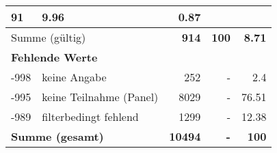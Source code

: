 \begin{longtable}{lXrrr}
       \num{91} &
       \num[round-mode=places,round-precision=2]{9.96} &
         \num[round-mode=places,round-precision=2]{0.87} \\
     \midrule
     \multicolumn{2}{l}{Summe (gültig)} &
       \textbf{\num{914}} &
     \textbf{\num{100}} &
       \textbf{\num[round-mode=places,round-precision=2]{8.71}} \\
     \multicolumn{5}{l}{\textbf{Fehlende Werte}}\\
       -998 &
       keine Angabe &
         \num{252} &
        - &
         \num[round-mode=places,round-precision=2]{2.4} \\
       -995 &
       keine Teilnahme (Panel) &
         \num{8029} &
        - &
         \num[round-mode=places,round-precision=2]{76.51} \\
       -989 &
       filterbedingt fehlend &
         \num{1299} &
        - &
         \num[round-mode=places,round-precision=2]{12.38} \\
     \midrule
     \multicolumn{2}{l}{\textbf{Summe (gesamt)}} &
          \textbf{\num{10494}} &
        \textbf{-} &
        \textbf{\num{100}} \\
     \bottomrule
     \end{longtable}
     
